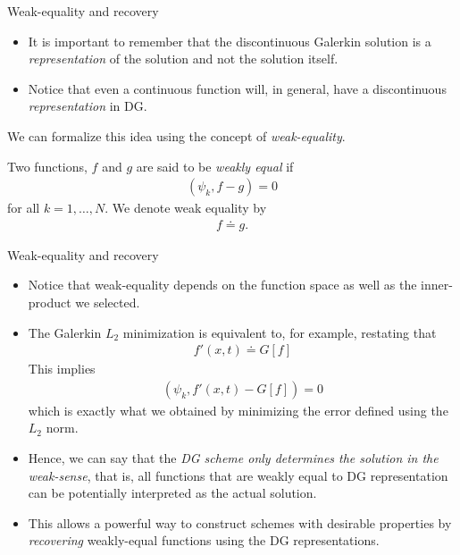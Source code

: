 \documentclass[aspectratio=169]{beamer}
\newcommand{\mypause}{\pause}
\newcommand{\cramplist}{
	\setlength{\itemsep}{0in}
	\setlength{\partopsep}{0in}
	\setlength{\topsep}{0in}}
\begin{document}
\begin{frame}{Weak-equality and recovery}
  \footnotesize
  \begin{itemize}\cramplist
  \item It is important to remember that the discontinuous Galerkin
    solution is a \emph{representation} of the solution and not the
    solution itself.
  \item Notice that even a continuous function will, in general, have
    a discontinuous \emph{representation} in DG.
  \end{itemize}
  \mypause%
  We can formalize this idea using the concept of
  \emph{weak-equality}.

  \begin{definition}
    Two functions, $f$ and $g$ are said to be \emph{weakly equal} if
    \begin{align*}
      (\psi_k,f-g) = 0
    \end{align*}
    for all $k=1,\ldots,N$. We denote weak equality by
    \begin{align*}
      f \doteq g.
    \end{align*}
  \end{definition}  
  
\end{frame}


\begin{frame}{Weak-equality and recovery}
  \footnotesize
  \begin{itemize}
  \item Notice that weak-equality depends on the function space as
    well as the inner-product we selected.
  \item The Galerkin $L_2$ minimization is equivalent to, for example,
    restating that
    \begin{align*}
      f'(x,t) \doteq G[f]
    \end{align*}
    This implies
    \begin{align*}
      \left(\psi_k, f'(x,t)- G[f] \right) = 0
    \end{align*}
    which is exactly what we obtained by minimizing the error defined    
    using the  $L_2$ norm. \mypause
  \item Hence, we can say that the \emph{DG scheme only determines the
      solution in the weak-sense}, that is, all functions that are
    weakly equal to DG representation can be potentially interpreted
    as the actual solution.
  \item This allows a powerful way to construct schemes with desirable
    properties by \emph{recovering} weakly-equal functions using the
    DG representations.
  \end{itemize}

\end{frame}
\end{document}
